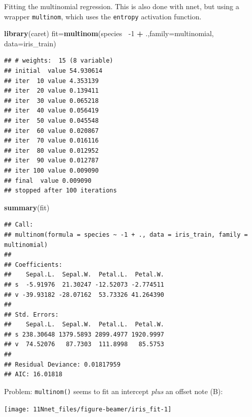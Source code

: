 \documentclass[10pt,ignorenonframetext,]{beamer}
\newenvironment{Shaded}{\begin{snugshade}}{\end{snugshade}}
\newcommand{\KeywordTok}[1]{\textcolor[rgb]{0.13,0.29,0.53}{\textbf{#1}}}
\newcommand{\DataTypeTok}[1]{\textcolor[rgb]{0.13,0.29,0.53}{#1}}
\newcommand{\DecValTok}[1]{\textcolor[rgb]{0.00,0.00,0.81}{#1}}
\newcommand{\StringTok}[1]{\textcolor[rgb]{0.31,0.60,0.02}{#1}}
\newcommand{\OperatorTok}[1]{\textcolor[rgb]{0.81,0.36,0.00}{\textbf{#1}}}
\newcommand{\NormalTok}[1]{#1}
\begin{document}
\begin{frame}[fragile]

Fitting the multinomial regression. This is also done with nnet, but
using a wrapper \texttt{multinom}, which uses the \texttt{entropy}
activation function.

\scriptsize

\begin{Shaded}
\begin{Highlighting}[]
\KeywordTok{library}\NormalTok{(caret)}
\NormalTok{fit=}\KeywordTok{multinom}\NormalTok{(species}\OperatorTok{~}\StringTok{ }\DecValTok{-1} \OperatorTok{+}\StringTok{ }\NormalTok{.,}\DataTypeTok{family=}\NormalTok{multinomial, }\DataTypeTok{data=}\NormalTok{iris_train)}
\end{Highlighting}
\end{Shaded}

\begin{verbatim}
## # weights:  15 (8 variable)
## initial  value 54.930614 
## iter  10 value 4.353139
## iter  20 value 0.139411
## iter  30 value 0.065218
## iter  40 value 0.056419
## iter  50 value 0.045548
## iter  60 value 0.020867
## iter  70 value 0.016116
## iter  80 value 0.012952
## iter  90 value 0.012787
## iter 100 value 0.009090
## final  value 0.009090 
## stopped after 100 iterations
\end{verbatim}

\begin{Shaded}
\begin{Highlighting}[]
\KeywordTok{summary}\NormalTok{(fit)}
\end{Highlighting}
\end{Shaded}

\begin{verbatim}
## Call:
## multinom(formula = species ~ -1 + ., data = iris_train, family = multinomial)
## 
## Coefficients:
##    Sepal.L.  Sepal.W.  Petal.L.  Petal.W.
## s  -5.91976  21.30247 -12.52073 -2.774511
## v -39.93182 -28.07162  53.73326 41.264390
## 
## Std. Errors:
##    Sepal.L.  Sepal.W.  Petal.L.  Petal.W.
## s 238.30648 1379.5893 2899.4977 1920.9997
## v  74.52076   87.7303  111.8998   85.5753
## 
## Residual Deviance: 0.01817959 
## AIC: 16.01818
\end{verbatim}

\end{frame}

\begin{frame}[fragile]

Problem: \texttt{multinom()} seems to fit an intercept \emph{plus} an
offset note (B):

\begin{center}\texttt{[image: 11Nnet\_files/figure-beamer/iris\_fit-1]} \end{center}

\end{frame}
\end{document}
